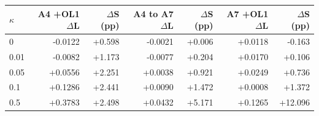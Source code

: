 \begin{tabular}{lrrrrrr}
\toprule
$\kappa$ & A4 +OL1 $\Delta$L & $\Delta$S (pp) & A4 to A7 $\Delta$L & $\Delta$S (pp) & A7 +OL1 $\Delta$L & $\Delta$S (pp) \\
\midrule
0 & -0.0122 & +0.598 & -0.0021 & +0.006 & +0.0118 & -0.163 \\
0.01 & -0.0082 & +1.173 & -0.0077 & +0.204 & +0.0170 & +0.106 \\
0.05 & +0.0556 & +2.251 & +0.0038 & +0.921 & +0.0249 & +0.736 \\
0.1 & +0.1286 & +2.441 & +0.0090 & +1.472 & +0.0008 & +1.372 \\
0.5 & +0.3783 & +2.498 & +0.0432 & +5.171 & +0.1265 & +12.096 \\
\bottomrule
\end{tabular}
